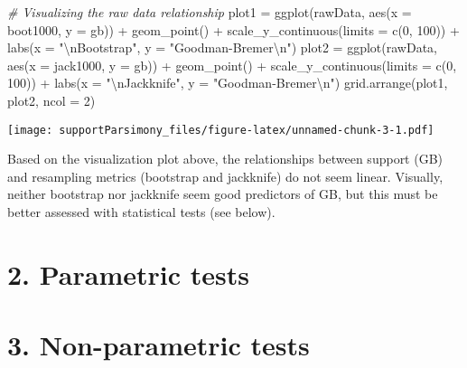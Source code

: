 \documentclass[
]{article}
\newenvironment{Shaded}{\begin{snugshade}}{\end{snugshade}}
\newcommand{\AttributeTok}[1]{\textcolor[rgb]{0.77,0.63,0.00}{#1}}
\newcommand{\CommentTok}[1]{\textcolor[rgb]{0.56,0.35,0.01}{\textit{#1}}}
\newcommand{\DecValTok}[1]{\textcolor[rgb]{0.00,0.00,0.81}{#1}}
\newcommand{\FunctionTok}[1]{\textcolor[rgb]{0.00,0.00,0.00}{#1}}
\newcommand{\NormalTok}[1]{#1}
\newcommand{\OtherTok}[1]{\textcolor[rgb]{0.56,0.35,0.01}{#1}}
\newcommand{\SpecialCharTok}[1]{\textcolor[rgb]{0.00,0.00,0.00}{#1}}
\newcommand{\StringTok}[1]{\textcolor[rgb]{0.31,0.60,0.02}{#1}}
\begin{document}
\begin{Shaded}
\begin{Highlighting}[]
\CommentTok{\# Visualizing the raw data relationship}
\NormalTok{plot1 }\OtherTok{=} \FunctionTok{ggplot}\NormalTok{(rawData, }\FunctionTok{aes}\NormalTok{(}\AttributeTok{x =}\NormalTok{ boot1000, }\AttributeTok{y =}\NormalTok{ gb)) }\SpecialCharTok{+}
  \FunctionTok{geom\_point}\NormalTok{() }\SpecialCharTok{+}
  \FunctionTok{scale\_y\_continuous}\NormalTok{(}\AttributeTok{limits =} \FunctionTok{c}\NormalTok{(}\DecValTok{0}\NormalTok{, }\DecValTok{100}\NormalTok{)) }\SpecialCharTok{+}
  \FunctionTok{labs}\NormalTok{(}\AttributeTok{x =} \StringTok{"}\SpecialCharTok{\textbackslash{}n}\StringTok{Bootstrap"}\NormalTok{, }\AttributeTok{y =} \StringTok{"Goodman{-}Bremer}\SpecialCharTok{\textbackslash{}n}\StringTok{"}\NormalTok{)}
\NormalTok{plot2 }\OtherTok{=} \FunctionTok{ggplot}\NormalTok{(rawData, }\FunctionTok{aes}\NormalTok{(}\AttributeTok{x =}\NormalTok{ jack1000, }\AttributeTok{y =}\NormalTok{ gb)) }\SpecialCharTok{+}
  \FunctionTok{geom\_point}\NormalTok{() }\SpecialCharTok{+}
  \FunctionTok{scale\_y\_continuous}\NormalTok{(}\AttributeTok{limits =} \FunctionTok{c}\NormalTok{(}\DecValTok{0}\NormalTok{, }\DecValTok{100}\NormalTok{)) }\SpecialCharTok{+}
  \FunctionTok{labs}\NormalTok{(}\AttributeTok{x =} \StringTok{"}\SpecialCharTok{\textbackslash{}n}\StringTok{Jackknife"}\NormalTok{, }\AttributeTok{y =} \StringTok{"Goodman{-}Bremer}\SpecialCharTok{\textbackslash{}n}\StringTok{"}\NormalTok{)}
\FunctionTok{grid.arrange}\NormalTok{(plot1, plot2, }\AttributeTok{ncol =} \DecValTok{2}\NormalTok{)}
\end{Highlighting}
\end{Shaded}

\texttt{[image: supportParsimony\_files/figure-latex/unnamed-chunk-3-1.pdf]}

Based on the visualization plot above, the relationships between support
(GB) and resampling metrics (bootstrap and jackknife) do not seem
linear. Visually, neither bootstrap nor jackknife seem good predictors
of GB, but this must be better assessed with statistical tests (see
below).

\hypertarget{parametric-tests}{%
\section{2. Parametric tests}\label{parametric-tests}}

\hypertarget{non-parametric-tests}{%
\section{3. Non-parametric tests}\label{non-parametric-tests}}
\end{document}
